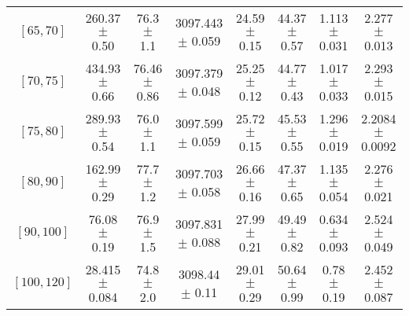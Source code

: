 \begin{tabular}{c||c|c|c|c|c|c|c}
$[65, 70]$ & 260.37 $\pm$ 0.50 & 76.3 $\pm$ 1.1 & 3097.443 $\pm$ 0.059 & 24.59 $\pm$ 0.15 & 44.37 $\pm$ 0.57 & 1.113 $\pm$ 0.031 & 2.277 $\pm$ 0.013\\
$[70, 75]$ & 434.93 $\pm$ 0.66 & 76.46 $\pm$ 0.86 & 3097.379 $\pm$ 0.048 & 25.25 $\pm$ 0.12 & 44.77 $\pm$ 0.43 & 1.017 $\pm$ 0.033 & 2.293 $\pm$ 0.015\\
$[75, 80]$ & 289.93 $\pm$ 0.54 & 76.0 $\pm$ 1.1 & 3097.599 $\pm$ 0.059 & 25.72 $\pm$ 0.15 & 45.53 $\pm$ 0.55 & 1.296 $\pm$ 0.019 & 2.2084 $\pm$ 0.0092\\
$[80, 90]$ & 162.99 $\pm$ 0.29 & 77.7 $\pm$ 1.2 & 3097.703 $\pm$ 0.058 & 26.66 $\pm$ 0.16 & 47.37 $\pm$ 0.65 & 1.135 $\pm$ 0.054 & 2.276 $\pm$ 0.021\\
$[90, 100]$ & 76.08 $\pm$ 0.19 & 76.9 $\pm$ 1.5 & 3097.831 $\pm$ 0.088 & 27.99 $\pm$ 0.21 & 49.49 $\pm$ 0.82 & 0.634 $\pm$ 0.093 & 2.524 $\pm$ 0.049\\
$[100, 120]$ & 28.415 $\pm$ 0.084 & 74.8 $\pm$ 2.0 & 3098.44 $\pm$ 0.11 & 29.01 $\pm$ 0.29 & 50.64 $\pm$ 0.99 & 0.78 $\pm$ 0.19 & 2.452 $\pm$ 0.087\\
\end{tabular}
